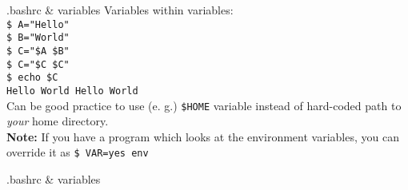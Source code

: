 \documentclass{beamer}
\let\tt\texttt
\let\bf\textbf
\let\it\itshape
\begin{document}
\begin{frame}{.bashrc \& variables}
        Variables within variables: \\
        \tt{\$ A="Hello"} \\
        \tt{\$ B="World"} \\
        \tt{\$ C="\$A \$B"} \\
        \tt{\$ C="\$C \$C"} \\
        \tt{\$ echo \$C} \\
        \tt{Hello World Hello World} \\
        Can be good practice to use (e. g.) \tt{\$HOME} variable instead of hard-coded path to {\it your} home directory. \\
        \bf{Note:} If you have a program which looks at the environment variables, you can override it as \tt{\$ VAR=yes env}
\end{frame}

\begin{frame}{.bashrc \& variables}
\end{frame}
\end{document}
